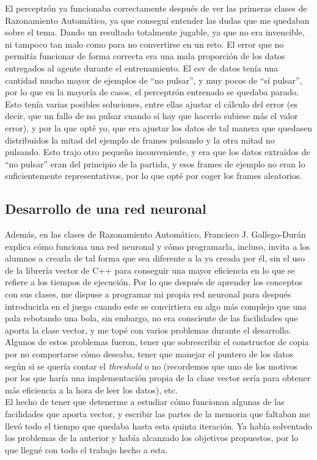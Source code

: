 El perceptrón ya funcionaba correctamente después de ver las primeras clases de Razonamiento Automático, ya que conseguí entender las dudas que me quedaban sobre el tema. Dando un resultado totalmente jugable, ya que no era invencible, ni tampoco tan malo como para no convertirse en un reto. El error que no permitía funcionar de forma correcta era una mala proporción de los datos entregados al agente durante el entrenamiento. El \gls{csv} de datos tenía una cantidad mucho mayor de ejemplos de ``no pulsar'', y muy pocos de ``sí pulsar'', por lo que en la mayoría de casos, el perceptrón entrenado se quedaba parado. Esto tenía varias posibles soluciones, entre ellas ajustar el cálculo del error (es decir, que un fallo de no pulsar cuando sí hay que hacerlo subiese más el valor error), y por la que opté yo, que era ajustar los datos de tal manera que quedasen distribuidos la mitad del ejemplo de frames pulsando y la otra mitad no pulsando. Esto trajo otro pequeño inconveniente, y era que los datos extraídos de ``no pulsar'' eran del principio de la partida, y esos frames de ejemplo no eran lo suficientemente representativos, por lo que opté por coger los frames aleatorios.

\subsection{Desarrollo de una red neuronal}
Además, en las clases de Razonamiento Automático, Francisco J. Gallego-Durán explica cómo funciona una red neuronal y cómo programarla, incluso, invita a los alumnos a crearla de tal forma que sea diferente a la ya creada por él, sin el uso de la librería vector de C++ para conseguir una mayor eficiencia en lo que se refiere a los tiempos de ejecución. Por lo que después de aprender los conceptos con sus clases, me dispuse a programar mi propia red neuronal para después introducirla en el juego cuando este se convirtiera en algo más complejo que una pala rebotando una bola, sin embargo, no era consciente de las facilidades que aporta la clase vector, y me topé con varios problemas durante el desarrollo.
\\
Algunos de estos problemas fueron, tener que sobrescribir el constructor de copia por no comportarse cómo deseaba, tener que manejar el puntero de los datos según si se quería contar el \textit{threshold} o no (recordemos que uno de los motivos por los que haría una implementación propia de la clase vector sería para obtener más eficiencia a la hora de leer los datos), etc.
\\
El hecho de tener que detenerme a estudiar cómo funcionan algunas de las facilidades que aporta vector, y escribir las partes de la memoria que faltaban me llevó todo el tiempo que quedaba hasta esta quinta iteración. Ya había solventado los problemas de la anterior y había alcanzado los objetivos propuestos, por lo que llegué con todo el trabajo hecho a esta.

